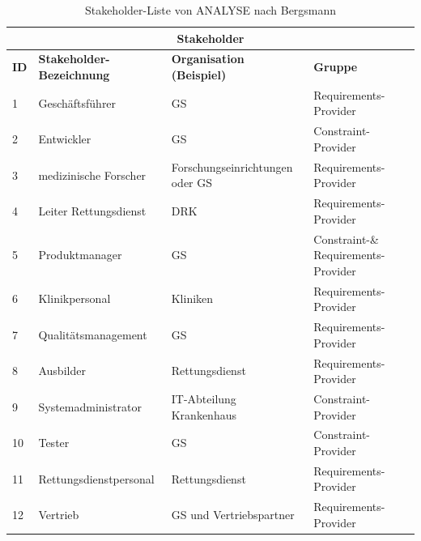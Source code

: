\begin{table}[htb]
\centering
\setlength{\extrarowheight}{4pt}
\begin{tabular}{ |p{0.5cm} | p{4cm} | p{5.5cm} |p{4cm} |}
  \hline
	\multicolumn{4}{|c|}{\textbf{Stakeholder}} \\
  \hline
\textbf{ID} & \textbf{Stakeholder-Bezeichnung} 	& \textbf{Organisation (Beispiel)} & \textbf{Gruppe}
  \\\hline
  1			& Geschäftsführer 					& \gls{GS} 				& Requirements-Provider
  \\\hline  
  2			& Entwickler 						& \gls{GS} 				& Constraint-Provider
  \\\hline
  3			& medizinische Forscher 			& Forschungseinrichtungen oder \gls{GS} & Requirements-Provider
  \\\hline
  4			& Leiter Rettungsdienst				& \gls{DRK}				& Requirements-Provider
  \\\hline
  5			& Produktmanager 					& \gls{GS} 				& Constraint-\& Requirements-Provider
  \\\hline
  6			& Klinikpersonal					& Kliniken			& Requirements-Provider
  \\\hline
  7			& Qualitätsmanagement 				& \gls{GS} 				& Requirements-Provider
  \\\hline
  8			& Ausbilder 						& Rettungsdienst 			& Requirements-Provider
  \\\hline
  9			& Systemadministrator 				& IT-Abteilung Krankenhaus				& Constraint-Provider
  \\\hline  
  10		& Tester 							& \gls{GS} 				& Constraint-Provider
  \\\hline
  11		& Rettungsdienstpersonal			& Rettungsdienst				& Requirements-Provider
  \\\hline
  12		& Vertrieb							& GS und Vertriebspartner	& Requirements-Provider
  \\\hline
\end{tabular} 
  \caption[Stakeholder-Liste \acrlong*{ANALYSE}]{Stakeholder-Liste von \gls{ANALYSE} nach Bergsmann \cite[S. 85]{Bergsmann.2018}}
  \label{tbl:Stakeholder-Liste}
\end{table}

